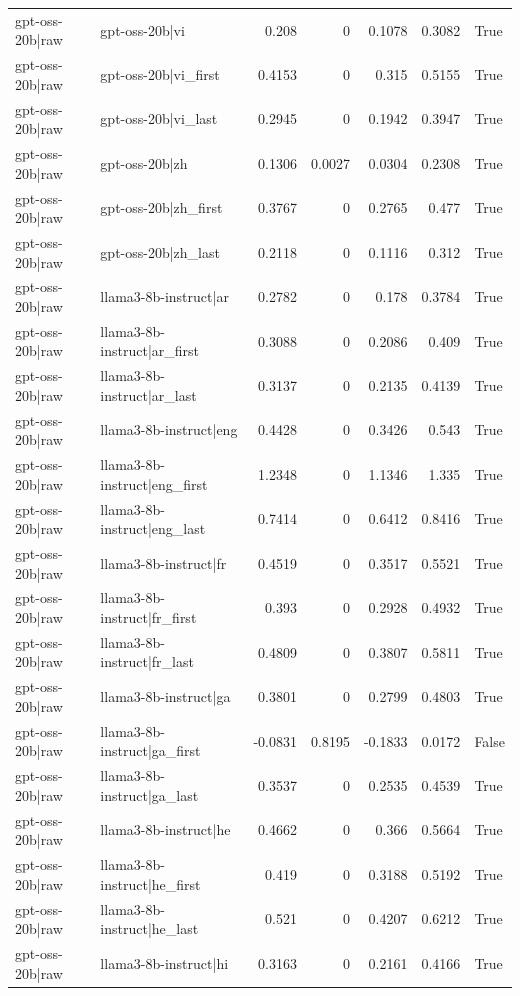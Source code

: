 \begin{table}
\begin{tabular}{l l r r r r l}
gpt-oss-20b|raw & gpt-oss-20b|vi & 0.208 & 0 & 0.1078 & 0.3082 & True \\
gpt-oss-20b|raw & gpt-oss-20b|vi_first & 0.4153 & 0 & 0.315 & 0.5155 & True \\
gpt-oss-20b|raw & gpt-oss-20b|vi_last & 0.2945 & 0 & 0.1942 & 0.3947 & True \\
gpt-oss-20b|raw & gpt-oss-20b|zh & 0.1306 & 0.0027 & 0.0304 & 0.2308 & True \\
gpt-oss-20b|raw & gpt-oss-20b|zh_first & 0.3767 & 0 & 0.2765 & 0.477 & True \\
gpt-oss-20b|raw & gpt-oss-20b|zh_last & 0.2118 & 0 & 0.1116 & 0.312 & True \\
gpt-oss-20b|raw & llama3-8b-instruct|ar & 0.2782 & 0 & 0.178 & 0.3784 & True \\
gpt-oss-20b|raw & llama3-8b-instruct|ar_first & 0.3088 & 0 & 0.2086 & 0.409 & True \\
gpt-oss-20b|raw & llama3-8b-instruct|ar_last & 0.3137 & 0 & 0.2135 & 0.4139 & True \\
gpt-oss-20b|raw & llama3-8b-instruct|eng & 0.4428 & 0 & 0.3426 & 0.543 & True \\
gpt-oss-20b|raw & llama3-8b-instruct|eng_first & 1.2348 & 0 & 1.1346 & 1.335 & True \\
gpt-oss-20b|raw & llama3-8b-instruct|eng_last & 0.7414 & 0 & 0.6412 & 0.8416 & True \\
gpt-oss-20b|raw & llama3-8b-instruct|fr & 0.4519 & 0 & 0.3517 & 0.5521 & True \\
gpt-oss-20b|raw & llama3-8b-instruct|fr_first & 0.393 & 0 & 0.2928 & 0.4932 & True \\
gpt-oss-20b|raw & llama3-8b-instruct|fr_last & 0.4809 & 0 & 0.3807 & 0.5811 & True \\
gpt-oss-20b|raw & llama3-8b-instruct|ga & 0.3801 & 0 & 0.2799 & 0.4803 & True \\
gpt-oss-20b|raw & llama3-8b-instruct|ga_first & -0.0831 & 0.8195 & -0.1833 & 0.0172 & False \\
gpt-oss-20b|raw & llama3-8b-instruct|ga_last & 0.3537 & 0 & 0.2535 & 0.4539 & True \\
gpt-oss-20b|raw & llama3-8b-instruct|he & 0.4662 & 0 & 0.366 & 0.5664 & True \\
gpt-oss-20b|raw & llama3-8b-instruct|he_first & 0.419 & 0 & 0.3188 & 0.5192 & True \\
gpt-oss-20b|raw & llama3-8b-instruct|he_last & 0.521 & 0 & 0.4207 & 0.6212 & True \\
gpt-oss-20b|raw & llama3-8b-instruct|hi & 0.3163 & 0 & 0.2161 & 0.4166 & True \\

\end{tabular}
\end{table}
